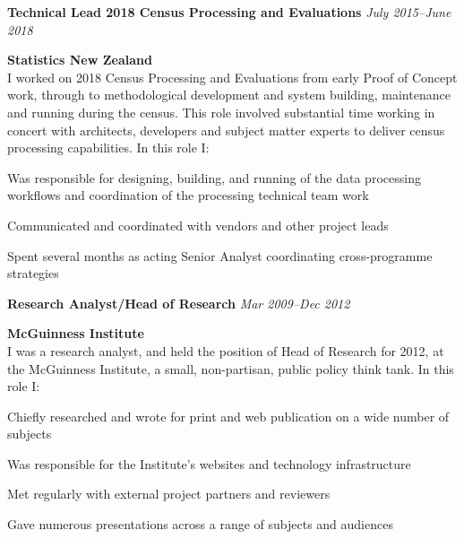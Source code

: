 \documentclass{article}[10pt] %
\newcommand{\jobtitle}[3]{
	\vspace{10 pt}
	\raggedleft\textbf{\color{altcolour}#1} \hfill \textit{#2} \\
	\raggedright\textbf{\color{soft}#3} 
	\\%
	}
\renewenvironment{itemize*}{

  \begin{list}{}{
    \itemsep 4pt
    \setlength{\leftmargin}{1.5em}
  }
}{
  \end{list}
    \vspace{7pt}
}
\begin{document}
\jobtitle{Technical Lead 2018 Census Processing and Evaluations}{July 2015--June 2018}{Statistics New Zealand}
I worked on 2018 Census Processing and Evaluations from early Proof of Concept work, through to methodological development and system building, maintenance and running during the census. This role involved substantial time working in concert with architects, developers and subject matter experts to deliver census processing capabilities. In this role I: \\
\begin{itemize*}
	\vspace{4pt}
	\item Was responsible for designing, building, and running of the data processing workflows and coordination of the processing technical team work 
	\item Communicated and coordinated with vendors and other project leads
	\item Spent several months as acting Senior Analyst coordinating cross-programme strategies
\end{itemize*}

\jobtitle{Research Analyst/Head of Research}{Mar 2009–Dec 2012}{McGuinness Institute}
I was a research analyst, and held the position of Head of Research for 2012, at the McGuinness Institute, a small, non-partisan, public policy think tank. In this role I:\\
\begin{itemize*}
	\vspace{4pt}
	\item Chiefly researched and wrote for print and web publication on a wide number of subjects
	\item Was responsible for the Institute’s websites and technology infrastructure
	\item Met regularly with external project partners and reviewers
	\item Gave numerous presentations across a range of subjects and audiences
\end{itemize*}
\end{document}
